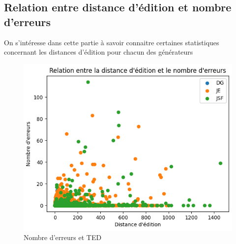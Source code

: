       
      \subsection{Relation entre distance d'édition et nombre d'erreurs}
        On s'intéresse dans cette partie à savoir connaitre certaines statistiques concernant les distances d'édition pour chacun des générateurs 
        \begin{figure}[H]
            \includegraphics[scale=1]{Photos/ted_vs_errors/ted_vs_nb_errors.PNG}
            \caption{Nombre d'erreurs et TED }
          \label{fig:ted_vs_errors}
        \end{figure}

